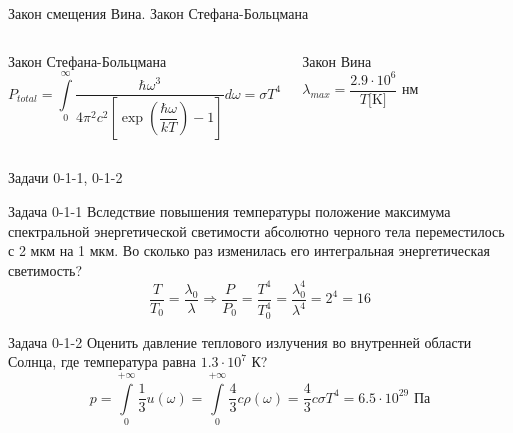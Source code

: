 \documentclass[12]{beamer}
\begin{document}
\begin{frame}[t]{Закон смещения Вина. Закон Стефана-Больцмана}
{\begin{columns}[t, onlytextwidth]
\begin{block}{Закон Стефана-Больцмана}
\begin{equation*}
\label{eq:sem_01_stefan_boltzman}
    P_{total} = \int\limits_{0}^{\infty}\dfrac{\hbar \omega^3}{4\pi^2c^2\left[ \exp{\left(\dfrac{\hbar \omega}{kT}\right)} - 1\right]}d\omega = \sigma T^4
\end{equation*}
\end{block}
\begin{block}{Закон  Вина}
\begin{equation*}
    \lambda_{max} = \dfrac{2.9 \cdot 10^6}{T \text{[K]}} \text{ нм}
\end{equation*}
\end{block}
\end{columns}}
\end{frame}

\begin{frame}{Задачи 0-1-1, 0-1-2}\scriptsize
\begin{block}{Задача 0-1-1}
Вследствие повышения температуры положение максимума спектральной  энергетической  светимости  абсолютно  черного  тела  переместилось  с  2 мкм на 1 мкм. Во сколько раз изменилась его интегральная энергетическая светимость?
\\[10pt]
\begin{equation*}
    \dfrac{T}{T_0} = \dfrac{\lambda_0}{\lambda} \Rightarrow \dfrac{P}{P_0} = \dfrac{T^4}{T^4_0} = \dfrac{\lambda^4_0}{\lambda^4} = 2^4 =16 
\end{equation*}
\end{block}

\begin{block}{Задача 0-1-2}
Оценить давление теплового излучения во внутренней области Солнца, где температура равна $1.3\cdot 10^7$ К?\\[10pt]
\begin{equation*}
    p=\int\limits_0^{+\infty}\dfrac{1}{3}u(\omega) = \int\limits_0^{+\infty}\dfrac{4}{3}c\rho(\omega) = \dfrac{4}{3}c\sigma T^4 = 6.5\cdot 10^{29} \text{ Па}
\end{equation*}
\end{block}
    
\end{frame}
\end{document}
